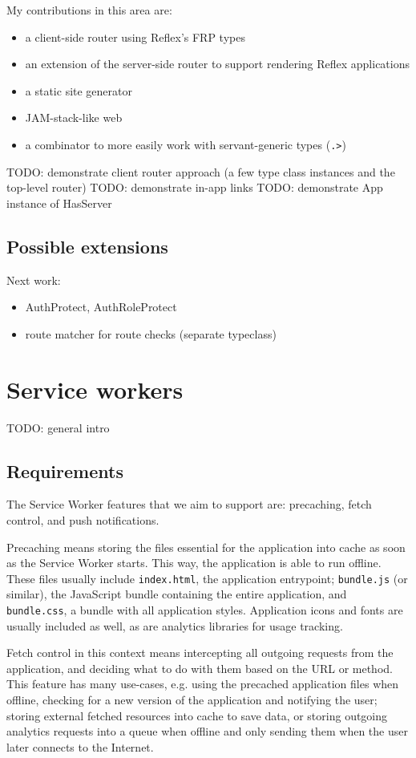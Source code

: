 \documentclass[english,odsaz]{fitthesis}
\begin{document}
My contributions in this area are:
\begin{itemize}
\item a client-side router using Reflex's FRP types
\item an extension of the server-side router to support rendering Reflex applications
\item a static site generator
\item JAM-stack-like web
\item a combinator to more easily work with servant-generic types (\texttt{.>})
\end{itemize}

TODO: demonstrate client router approach (a few type class instances and the
top-level router)
TODO: demonstrate in-app links
TODO: demonstrate App instance of HasServer

\subsection{Possible extensions}
\label{sec:orgbea0c44}
Next work:
\begin{itemize}
\item AuthProtect, AuthRoleProtect
\item route matcher for route checks (separate typeclass)
\end{itemize}

\section{Service workers}
\label{sec:orgddac874}
TODO: general intro

\subsection{Requirements}
\label{sec:org8c06d49}
The Service Worker features that we aim to support are: precaching, fetch
control, and push notifications.

Precaching means storing the files essential for the application into cache as
soon as the Service Worker starts. This way, the application is able to run
offline. These files usually include \texttt{index.html}, the application entrypoint;
\texttt{bundle.js} (or similar), the JavaScript bundle containing the entire application,
and \texttt{bundle.css}, a bundle with all application styles. Application icons and
fonts are usually included as well, as are analytics libraries for usage
tracking.

Fetch control in this context means intercepting all outgoing requests from the
application, and deciding what to do with them based on the URL or method. This
feature has many use-cases, e.g. using the precached application files when
offline, checking for a new version of the application and notifying the user;
storing external fetched resources into cache to save data, or storing outgoing
analytics requests into a queue when offline and only sending them when the user
later connects to the Internet.
\end{document}
